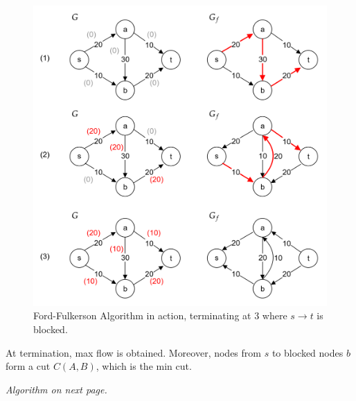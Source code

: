 \begin{figure}[h]
    \centering
    \includegraphics[width=.8\textwidth]{Sections/net/ff.png}
    \caption{Ford-Fulkerson Algorithm in action, terminating at 3 where $s\to t$ is blocked.}
\end{figure}

\begin{theo}

    At termination, max flow is obtained. Moreover, nodes from $s$ to blocked nodes $b$ form a cut $C(A,B)$, which is the min cut.
\end{theo}

\vfill

\begin{center}
    \textit{Algorithm on next page.}
\end{center}

\vfill

\newpage


